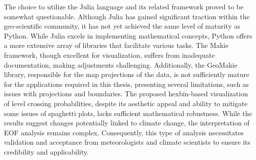 %
%

The choice to utilize the Julia language and its related framework proved to be somewhat questionable. Although Julia has gained significant traction within the geo-scientific community, it has not yet achieved the same level of maturity as Python. While Julia excels in implementing mathematical concepts, Python offers a more extensive array of libraries that facilitate various tasks.
The Makie framework, though excellent for visualization, suffers from inadequate documentation, making adjustments challenging. 
Additionally, the GeoMakie library, responsible for the map projections of the data, is not sufficiently mature for the applications required in this thesis, presenting several limitations, such as issues with projections and boundaries.
The proposed hexbin-based visualization of level crossing probabilities, despite its aesthetic appeal and ability to mitigate some issues of spaghetti plots, lacks sufficient mathematical robustness.
While the results suggest changes potentially linked to climate change, the interpretation of EOF analysis remains complex. 
Consequently, this type of analysis necessitates validation and acceptance from meteorologists and climate scientists to ensure its credibility and applicability.

